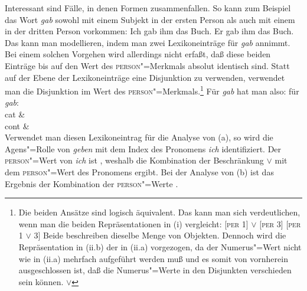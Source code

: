 Interessant sind Fälle, in denen Formen zusammenfallen. So kann zum Beispiel das Wort
\emph{gab} sowohl mit einem Subjekt in der ersten Person als auch mit einem in der dritten Person vorkommen:
\eal
\ex Ich gab ihm das Buch.
\ex Er  gab ihm das Buch.
\zl
Das kann man modellieren, indem man zwei Lexikoneinträge für \emph{gab} annimmt. Bei einem solchen Vorgehen
wird allerdings nicht erfaßt, daß diese beiden Einträge bis auf den Wert des \textsc{person}"=Merkmals absolut
identisch sind. Statt auf der Ebene der Lexikoneinträge eine Disjunktion zu verwenden, verwendet man
die Disjunktion im Wert des \textsc{person}"=Merkmals.\footnote{
  Die beiden Ansätze sind logisch äquivalent. Das kann man sich verdeutlichen, wenn man die
  beiden Repräsentationen in (i) vergleicht:
  \eal
  \ex {} [\textsc{per} 1] $\vee$ [\textsc{per} 3]
  \ex {} [\textsc{per} 1 $\vee$ 3]
  \zl
  Beide beschreiben dieselbe Menge von Objekten. Dennoch wird die Repräsentation in (ii.b) der
  in (ii.a) vorgezogen, da der Numerus"=Wert nicht wie in (ii.a) mehrfach aufgeführt werden
  muß und es somit von vornherein ausgeschlossen ist, daß die Numerus"=Werte in den Disjunkten
  verschieden sein können.
  \eal
  \ex {}  $\vee$ 
  \ex {}
  \zllast
}
Für \emph{gab} hat man also:
\ea
\label{le-gab}
\localw für \emph{gab}:\\
\ms
{ cat &  \\
  cont &   \\
}
\z
Verwendet man diesen Lexikoneintrag für die Analyse von (a), so wird die Agens"=Rolle
von \emph{geben} mit dem Index des Pronomens \emph{ich} identifiziert. Der \textsc{person}"=Wert von
\emph{ich} ist , weshalb die Kombination der Beschränkung  $\vee$  mit dem \textsc{person}"=Wert 
des Pronomens  ergibt. Bei der Analyse von (b) ist das Ergebnis der Kombination
der \textsc{person}"=Werte .

